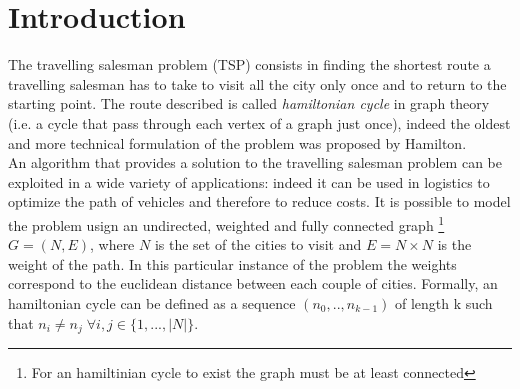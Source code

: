 \documentclass{article}
\begin{document}
\section{Introduction}
The travelling salesman problem (TSP) consists in finding the shortest route a travelling salesman has to take to visit all the city only once and to return to the starting point. The route described is called \textit{hamiltonian cycle} in graph theory (i.e. a cycle that pass through each vertex of a graph just once), indeed the oldest and more technical formulation of the problem was proposed by Hamilton. \\
An algorithm that provides a solution to the travelling salesman problem can be exploited in a wide variety of applications: indeed it can be used in logistics to optimize the path of vehicles and therefore to reduce costs.
It is possible to model the problem usign an undirected, weighted and fully connected graph \footnote{For an hamiltinian cycle to exist the graph must be at least connected} $G = (N,E)$, where $N$ is the set of the cities to visit and $E =  N \times N$ is the weight of the path. In this particular instance of the problem the weights correspond to the euclidean distance between each couple of cities.
Formally, an hamiltonian cycle can be defined as a sequence $(n_0, .., n_{k-1})$ of length k such that $n_i \neq n_j \; \forall i,j \in \{1,..., |N|\}$. \\
\end{document}
